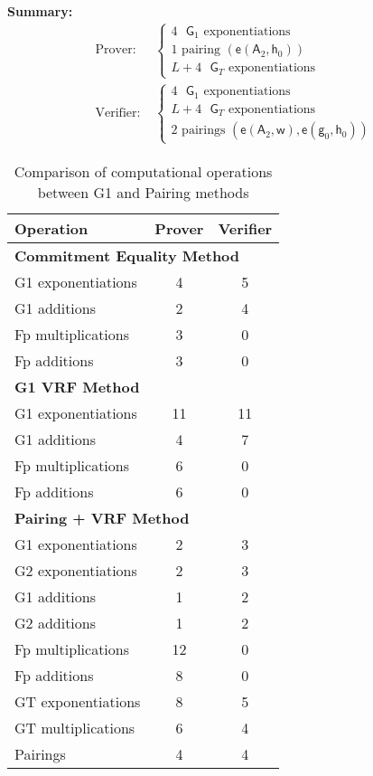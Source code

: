 {\noindent \textbf{Summary:}
\[
\begin{aligned}
\text{Prover: } & 
\begin{cases} 
4 \text{ $\mathsf{G}_1$ exponentiations} \\
1 \text{ pairing } (\mathsf{e}(\mathsf{A}_2, \mathsf{h}_0)) \\
L+4 \text{ $\mathsf{G}_T$ exponentiations}
\end{cases} \\
\text{Verifier: } & 
\begin{cases} 
4 \text{ $\mathsf{G}_1$ exponentiations} \\
L+4 \text{ $\mathsf{G}_T$ exponentiations} \\
2 \text{ pairings } (\mathsf{e}(\mathsf{A}_2, \mathsf{w}), \mathsf{e}(\mathsf{g}_0, \mathsf{h}_0))
\end{cases}
\end{aligned}
\]


















\newpage
\begin{table}[h]
\centering
\begin{tabular}{|l|c|c|}
\hline
\textbf{Operation} & \textbf{Prover} & \textbf{Verifier} \\
\hline
\multicolumn{3}{|l|}{\textbf{Commitment Equality Method}} \\
\hline
G1 exponentiations & 4 & 5 \\
G1 additions & 2 & 4 \\
Fp multiplications & 3 & 0 \\
Fp additions & 3 & 0 \\
\hline
\multicolumn{3}{|l|}{\textbf{G1 VRF Method}} \\
\hline
G1 exponentiations & 11 & 11 \\
G1 additions & 4 & 7 \\
Fp multiplications & 6 & 0 \\
Fp additions & 6 & 0 \\
\hline
\multicolumn{3}{|l|}{\textbf{Pairing + VRF Method}} \\
\hline
G1 exponentiations & 2 & 3 \\
G2 exponentiations & 2 & 3 \\
G1 additions & 1 & 2 \\
G2 additions & 1 & 2 \\
Fp multiplications & 12 & 0 \\
Fp additions & 8 & 0 \\
GT exponentiations & 8 & 5 \\
GT multiplications & 6 & 4 \\
Pairings & 4 & 4 \\
\hline
\end{tabular}
\caption{Comparison of computational operations between G1 and Pairing methods}
\end{table}

}

